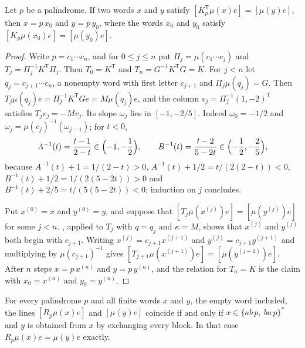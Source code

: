 \begin{lemma}
\label{lem:centre-reading}
Let $p$ be a palindrome. If two words $x$ and $y$ satisfy
$[K_p^{\mathsf T}\mu(x)e]=[\mu(y)e]$, then $x=p\,x_0$ and $y=p\,y_0$, where the words $x_0$ and
$y_0$ satisfy $[K_p\mu(x_0)e]=[\mu(y_0)e]$.
\end{lemma}

\begin{proof}
Write $p=c_1\cdots c_n$, and for $0\leqslant j\leqslant n$ put $\Pi_j=\mu(c_1\cdots c_j)$ and
$T_j=\Pi_j^{-1}K^{\mathsf T}\Pi_j$. Then $T_0=K^{\mathsf T}$ and $T_n=G^{-1}K^{\mathsf T}G=K$. For
$j<n$ let $q_j=c_{j+1}\cdots c_n$, a nonempty word with first letter $c_{j+1}$ and
$\Pi_j\mu(q_j)=G$. Then $T_j\mu(q_j)e=\Pi_j^{-1}K^{\mathsf T}Ge=M\mu(q_j)e$, and the column
$v_j=\Pi_j^{-1}(1,-2)^{\mathsf T}$ satisfies $T_jv_j=-Mv_j$. Its slope $\omega_j$ lies in
$[-1,-2/5]$. Indeed $\omega_0=-1/2$ and $\omega_j=\mu(c_j)^{-1}(\omega_{j-1})$; for $t<0$,
$$
 A^{-1}(t)=\frac{t-1}{2-t}\in\Bigl(-1,-\frac12\Bigr),\qquad
 B^{-1}(t)=\frac{t-2}{5-2t}\in\Bigl(-\frac12,-\frac25\Bigr),
$$
because $A^{-1}(t)+1=1/(2-t)>0$, $A^{-1}(t)+1/2=t/(2(2-t))<0$, $B^{-1}(t)+1/2=1/(2(5-2t))>0$ and
$B^{-1}(t)+2/5=t/(5(5-2t))<0$; induction on $j$ concludes.

Put $x^{(0)}=x$ and $y^{(0)}=y$, and suppose that $[T_j\mu(x^{(j)})e]=[\mu(y^{(j)})e]$ for some
$j<n$. , applied to $T_j$ with $q=q_j$ and $\kappa=M$, shows that
$x^{(j)}$ and $y^{(j)}$ both begin with $c_{j+1}$. Writing $x^{(j)}=c_{j+1}x^{(j+1)}$ and
$y^{(j)}=c_{j+1}y^{(j+1)}$ and multiplying by $\mu(c_{j+1})^{-1}$ gives
$[T_{j+1}\mu(x^{(j+1)})e]=[\mu(y^{(j+1)})e]$. After $n$ steps $x=p\,x^{(n)}$ and $y=p\,y^{(n)}$, and
the relation for $T_n=K$ is the claim with $x_0=x^{(n)}$ and $y_0=y^{(n)}$.
\end{proof}

\begin{theorem}
\label{thm:centre-decoder}
For every palindrome $p$ and all finite words $x$ and $y$, the empty word included, the lines
$[R_p\mu(x)e]$ and $[\mu(y)e]$ coincide if and only if $x\in\{ab\,p,\ ba\,p\}^*$ and $y$ is
obtained from $x$ by exchanging every block. In that case $R_p\mu(x)e=\mu(y)e$ exactly.
\end{theorem}

